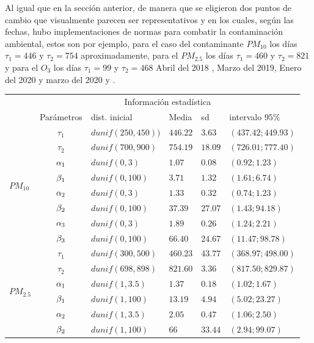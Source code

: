 Al igual que en la sección anterior, de manera que se eligieron dos puntos de cambio que visualmente parecen ser representativos y en los cuales, según las fechas, hubo implementaciones de normas para combatir la contaminación ambiental, estos son por ejemplo, para el caso del contaminante $PM_{10}$ los días $\tau_1=446$ y $\tau_2=754$ aproximadamente, para el $PM_{2.5}$ los días $\tau_1=460$ y $\tau_2=821$ y para el $O_3$ los días $\tau_1=99$ y $\tau_2=468$ 
Abril del 2018 \cite{res2018}, Marzo del 2019\cite{barreto}, Enero del 2020 y marzo del 2020 \cite{dec2020} y \cite{dec20202}. 
\begin{table}[!h]
\centering
\begin{tabular}{|l|c|l|l|l|l|}
\hline
& \multicolumn{5}{c|}{Información estadística} \\
\cline{2-6}
& Parámetros & dist. inicial  & Media & sd  &   intervalo $95 \%$\\
\hline \hline
\multirow{8}{1.5cm}{$PM_{10}$} & $\tau_1$ & $dunif(250,450))$ & $446.22$ & $3.63 $ & $(437.42;449.93)$ \\ \cline{2-6}
& $\tau_2$& $dunif(700, 900)$ & $754.19$ & $18.09$ & $(726.01;777.40)$\\  \cline{2-6}
& $\alpha_1$& $dunif(0,3)$ & $1.07$ & $0.08$ & $(0.92;1.23)$\\  \cline{2-6}
& $\beta_1$& $dunif(0,100)$ & $3.71$ & $1.32$ & $(1.61; 6.74)$\\  \cline{2-6}
& $\alpha_2$& $dunif(0,3)$ & $1.33$ & $0.32$ & $(0.74; 1.23)$\\  \cline{2-6}
& $\beta_2$& $dunif(0,100)$ & $37.39$ & $27.07$ & $(1.43; 94.18)$\\  \cline{2-6}
& $\alpha_3$& $dunif(0,3)$ & $1.89$ & $0.26$ & $(1.24; 2.21)$\\  \cline{2-6}
& $\beta_3$& $dunif(0,100)$ & $66.40$ & $24.67 $ & $(11.47;98.78)$\\  \cline{1-6}
\multirow{8}{1.5cm}{$PM_{2.5}$} & $\tau_1$ & $dunif(300,500)$& $460.23$ & $43.77$ & $(368.97;498.00)$\\ \cline{2-6}
& $\tau_2$& $dunif(698,898)$ & $821.60$ & $3.36$ & $(817.50;829.87)$\\  \cline{2-6}
& $\alpha_1$& $dunif(1,3.5)$ & $1.37$ & $0.18$ & $(1.02;1.67)$\\  \cline{2-6}
& $\beta_1$& $dunif(1,100)$ & $13.19$ & $4.94$ & $(5.02;23.27)$\\  \cline{2-6}
& $\alpha_2$& $dunif(1,3.5)$ & $2.05$ & $0.47$ & $(1.06;2.50)$\\  \cline{2-6}
& $\beta_2$& $dunif(1,100)$ & $66$ & $33.44$ & $(2.94;99.07)$\\  \cline{2-6}

\end{tabular}
\end{table}

